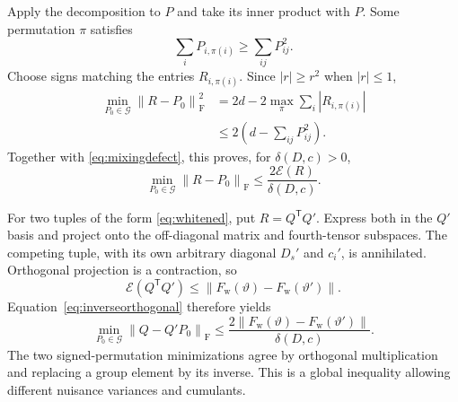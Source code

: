 \documentclass[11pt,a4paper]{article}
\numberwithin{equation}{section}
\newcommand{\cG}{\mathcal G}
\newcommand{\T}{\mathsf T}
\newcommand{\F}{\mathrm F}
\newcommand{\norm}[1]{\left\lVert #1\right\rVert}
\begin{document}
Apply the decomposition to \(P\) and take its inner product with \(P\).
Some permutation \(\pi\) satisfies
\[
 \sum_iP_{i,\pi(i)}\ge\sum_{ij}P_{ij}^2.
\]
Choose signs matching the entries \(R_{i,\pi(i)}\).
Since \(|r|\ge r^2\) when \(|r|\le1\),
\begin{align*}
 \min_{P_0\in\cG}\norm{R-P_0}_{\F}^2
 &=2d-2\max_\pi\sum_i|R_{i,\pi(i)}|\\
 &\le2\left(d-\sum_{ij}P_{ij}^2\right).
\end{align*}
Together with \eqref{eq:mixingdefect}, this proves, for \(\delta(D,c)>0\),
\begin{equation}\label{eq:inverseorthogonal}
 \min_{P_0\in\cG}\norm{R-P_0}_{\F}
 \le\frac{2\mathcal E(R)}{\delta(D,c)}.
\end{equation}

For two tuples of the form \eqref{eq:whitened}, put \(R=Q^\T Q'\).
Express both in the \(Q'\) basis and project onto the off-diagonal matrix
and fourth-tensor subspaces. The competing tuple, with its own arbitrary
diagonal \(D_s'\) and \(c_i'\), is annihilated. Orthogonal projection is a
contraction, so
\[
 \mathcal E(Q^\T Q')
 \le\norm{F_{\mathrm w}(\vartheta)-F_{\mathrm w}(\vartheta')}.
\]
Equation~\eqref{eq:inverseorthogonal} therefore yields
\begin{equation}\label{eq:inversefeatures}
 \min_{P_0\in\cG}\norm{Q-Q'P_0}_{\F}
 \le\frac{2\norm{F_{\mathrm w}(\vartheta)-F_{\mathrm w}(\vartheta')}}
              {\delta(D,c)}.
\end{equation}
The two signed-permutation minimizations agree by orthogonal
multiplication and replacing a group element by its inverse.
This is a global inequality allowing different nuisance variances and
cumulants.
\end{document}

